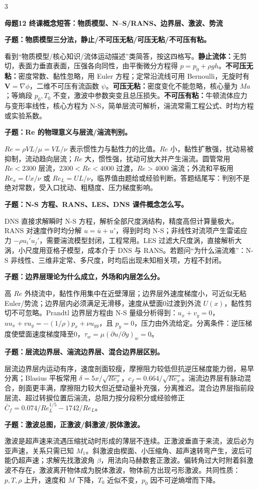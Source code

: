 \documentclass[a4paper]{article}
\newcommand{\mt}[1]{\vspace{0.22pt}\colorbox{M}{\parbox{\dimexpr\linewidth-2\fboxsep}{\color{white}\bfseries #1}}\par}
\newcommand{\qt}[1]{\vspace{0.10pt}\colorbox{Q}{\parbox{\dimexpr\linewidth-2\fboxsep}{\color{white}\bfseries #1}}\par}
\newcommand{\ans}[1]{\colorbox{G}{\parbox{\dimexpr\linewidth-2\fboxsep}{#1}}\par}
\begin{document}
\begin{multicols}{3}
\mt{母题12 终课概念短答：物质模型、N--S/RANS、边界层、激波、势流}
\qt{子题：物质模型三分法，静止/不可压无粘/可压无粘/不可压有粘。}
\ans{看到“物质模型/核心知识/流体运动描述”类简答，按这四格写。\textbf{静止流体：}无剪切，表面力垂直表面，压强各向同性，由平衡微分方程得 $p=p_0+\rho gh$。\textbf{不可压无粘：}密度常数、黏性忽略，用 Euler 方程；定常沿流线可用 Bernoulli，无旋时有 $\bm V=\nabla\phi$，二维不可压有流函数 $\psi$。\textbf{可压无粘：}密度变化不能忽略，核心量为 $Ma$；等熵段 $p_0,T_0$ 不变，激波中参数突变且总压损失。\textbf{不可压有粘：}牛顿流体应力与变形率线性，核心方程为 N-S，简单层流可解析，湍流常需工程公式、时均方程或实验系数。}
\qt{子题：Re 的物理意义与层流/湍流判别。}
\ans{$Re=\rho VL/\mu=VL/\nu$ 表示惯性力与黏性力的比值。$Re$ 小，黏性扩散强，扰动易被抑制，流动趋向层流；$Re$ 大，惯性强，扰动可放大并产生湍流。圆管常用 $Re<2300$ 层流，$2300<Re<4000$ 过渡，$Re>4000$ 湍流；外流和平板用 $Re_x=Ux/\nu$ 或 $Re_L=UL/\nu$，临界值由题给或经验判断。答题结尾写：判别不是绝对常数，受入口扰动、粗糙度、压力梯度影响。}
\qt{子题：N-S 方程、RANS、LES、DNS 课件概念怎么写。}
\ans{DNS 直接求解瞬时 N-S 方程，解析全部尺度涡结构，精度高但计算量极大。RANS 对速度作时均分解 $u=\bar u+u'$，得到时均 N-S；非线性对流项产生雷诺应力 $-\rho\overline{u_i'u_j'}$，需要湍流模型封闭，工程常用。LES 过滤大尺度涡，直接解析大涡，小尺度用亚格子模型，成本介于 DNS 与 RANS。若题问“为什么湍流难”：N-S 非线性、三维非定常、多尺度，时均后出现未知相关项，方程不封闭。}
\qt{子题：边界层理论为什么成立，外场和内层怎么分。}
\ans{高 $Re$ 外绕流中，黏性作用集中在近壁薄层；边界层外速度梯度小，可近似无粘 Euler/势流；边界层内必须满足无滑移，速度从壁面0过渡到外流 $U(x)$，黏性剪切不可忽略。Prandtl 边界层方程由 N-S 量级分析得到：$u_x+v_y=0$，$uu_x+vu_y=-(1/\rho)p_x+\nu u_{yy}$，且 $p_y=0$，压力由外流给定。分离条件：逆压梯度使壁面速度梯度降至0，$\tau_w=\mu(\partial u/\partial y)_w=0$。}
\qt{子题：层流边界层、湍流边界层、混合边界层区别。}
\ans{层流边界层内运动有序，速度剖面较瘦，摩擦阻力较低但抗逆压梯度能力弱，易早分离；Blasius 平板常用 $\delta=5x/\sqrt{Re_x}$，$c_f=0.664/\sqrt{Re_x}$。湍流边界层有脉动混合，剖面更丰满，摩擦阻力较大但近壁动量补充强，分离推迟。混合边界层指前段层流、超过转捩位置后湍流，总阻力按分段积分或经验修正 $\bar C_f=0.074/Re_L^{1/5}-1742/Re_L$。}
\qt{子题：激波总图，正激波/斜激波/脱体激波。}
\ans{激波是超声速来流遇压缩扰动时形成的薄层不连续。正激波垂直于来流，波后必为亚声速，关系只需已知 $M_1$。斜激波由楔面、小压缩角、超声速转弯产生，波后可能仍超声速；求解先找激波角 $\beta$，用法向马赫数套正激波。偏转角过大时附着斜激波不存在，激波离开物体成为脱体激波，物体前方出现弓形激波。共同性质：$p,T,\rho$ 上升，速度和 $M$ 下降，$T_0$ 近似不变，$p_0$ 因不可逆熵增而下降。}

\end{multicols}
\end{document}
